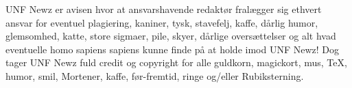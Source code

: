 \begin{minipage}[b]{0.95\linewidth}
\begin{minipage}[t]{0.47\textwidth}
\end{minipage}

\begin{center}
\tiny UNF Newz er avisen hvor at ansvarshavende redaktør fralægger sig ethvert ansvar for eventuel plagiering, kaniner, tysk, stavefelj, kaffe, dårlig humor, glemsomhed, katte, store sigmaer, pile, skyer, dårlige oversættelser og alt hvad eventuelle homo sapiens sapiens kunne finde på at holde imod UNF Newz! Dog tager UNF Newz fuld credit og copyright for alle guldkorn, magickort, mus, \TeX, humor, smil, Mortener, kaffe, før-fremtid, ringe og/eller Rubiksterning.
\end{center}
\end{minipage}

